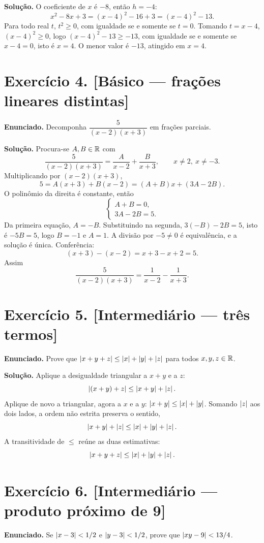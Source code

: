 \documentclass[11pt,a4paper]{article}
\begin{document}
\textbf{Solução.}
O coeficiente de $x$ é $-8$, então $h=-4$:
\[
x^2-8x+3=(x-4)^2-16+3=(x-4)^2-13.
\]
Para todo real $t$, $t^2\ge 0$, com igualdade se e somente se $t=0$. Tomando $t=x-4$, $(x-4)^2\ge 0$, logo $(x-4)^2-13\ge -13$, com igualdade se e somente se $x-4=0$, isto é $x=4$. O menor valor é $-13$, atingido em $x=4$.

\section*{Exercício 4. [Básico --- frações lineares distintas]}

\textbf{Enunciado.} Decomponha $\dfrac{5}{(x-2)(x+3)}$ em frações parciais.

\textbf{Solução.}
Procura-se $A,B\in\mathbb{R}$ com
\[
\frac{5}{(x-2)(x+3)}=\frac{A}{x-2}+\frac{B}{x+3},\qquad x\neq 2,\ x\neq -3.
\]
Multiplicando por $(x-2)(x+3)$,
\[
5=A(x+3)+B(x-2)=(A+B)x+(3A-2B).
\]
O polinômio da direita é constante, então
\[
\begin{cases}
A+B=0,\\
3A-2B=5.
\end{cases}
\]
Da primeira equação, $A=-B$. Substituindo na segunda, $3(-B)-2B=5$, isto é $-5B=5$, logo $B=-1$ e $A=1$. A divisão por $-5\neq 0$ é equivalência, e a solução é única. Conferência:
\[
(x+3)-(x-2)=x+3-x+2=5.
\]
Assim
\[
\frac{5}{(x-2)(x+3)}=\frac{1}{x-2}-\frac{1}{x+3}.
\]

\section*{Exercício 5. [Intermediário --- três termos]}

\textbf{Enunciado.} Prove que $\left\lvert x+y+z \right\rvert\le\left\lvert x \right\rvert+\left\lvert y \right\rvert+\left\lvert z \right\rvert$ para todos $x,y,z\in\mathbb{R}$.

\textbf{Solução.}
Aplique a desigualdade triangular a $x+y$ e a $z$:
\[
\left\lvert (x+y)+z \right\rvert\le\left\lvert x+y \right\rvert+\left\lvert z \right\rvert.
\]
Aplique de novo a triangular, agora a $x$ e a $y$: $\left\lvert x+y \right\rvert\le\left\lvert x \right\rvert+\left\lvert y \right\rvert$. Somando $\left\lvert z \right\rvert$ aos dois lados, a ordem não estrita preserva o sentido,
\[
\left\lvert x+y \right\rvert+\left\lvert z \right\rvert\le\left\lvert x \right\rvert+\left\lvert y \right\rvert+\left\lvert z \right\rvert.
\]
A transitividade de $\le$ reúne as duas estimativas:
\[
\left\lvert x+y+z \right\rvert\le\left\lvert x \right\rvert+\left\lvert y \right\rvert+\left\lvert z \right\rvert.
\]

\section*{Exercício 6. [Intermediário --- produto próximo de 9]}

\textbf{Enunciado.} Se $\left\lvert x-3 \right\rvert<1/2$ e $\left\lvert y-3 \right\rvert<1/2$, prove que $\left\lvert xy-9 \right\rvert<13/4$.
\end{document}
